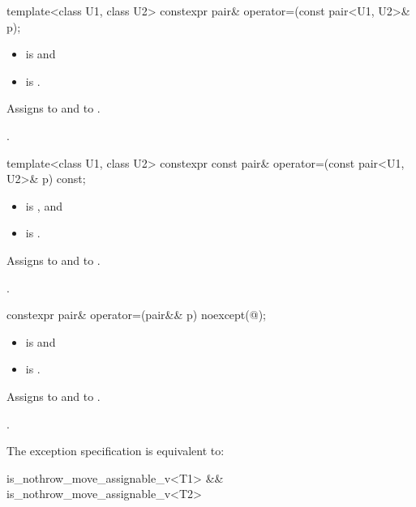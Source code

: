 %
\begin{itemdecl}
template<class U1, class U2> constexpr pair& operator=(const pair<U1, U2>& p);
\end{itemdecl}

\begin{itemdescr}
\pnum
\constraints
\begin{itemize}
\item {} is  and
\item {} is .
\end{itemize}

\pnum
\effects
Assigns  to  and  to .

\pnum
\returns
{}.
\end{itemdescr}

%
\begin{itemdecl}
template<class U1, class U2> constexpr const pair& operator=(const pair<U1, U2>& p) const;
\end{itemdecl}

\begin{itemdescr}
\pnum
\constraints
\begin{itemize}
\item
{} is , and
\item
{} is .
\end{itemize}

\pnum
\effects
Assigns  to  and  to .

\pnum
\returns
{}.
\end{itemdescr}

%
\begin{itemdecl}
constexpr pair& operator=(pair&& p) noexcept(@\seebelow@);
\end{itemdecl}

\begin{itemdescr}
\pnum
\constraints
\begin{itemize}
\item {} is  and
\item {} is .
\end{itemize}

\pnum
\effects
Assigns  to  and
 to .

\pnum
\returns
{}.

\pnum
\remarks
The exception specification is equivalent to:
\begin{codeblock}
is_nothrow_move_assignable_v<T1> && is_nothrow_move_assignable_v<T2>
\end{codeblock}
\end{itemdescr}

